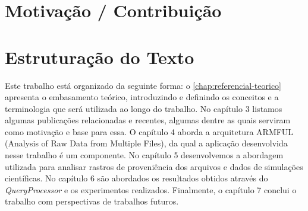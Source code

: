 


\section{Motivação / Contribuição} %

\section{Estruturação do Texto}


Este trabalho está organizado da seguinte forma:
o \autoref{chap:referencial-teorico} apresenta o embasamento teórico, introduzindo e definindo os conceitos e a terminologia que será utilizada ao longo do trabalho.
No capítulo 3 listamos algumas publicações relacionadas e recentes, algumas dentre as quais serviram como motivação e base para essa.
O capítulo 4 aborda a arquitetura  ARMFUL (Analysis of Raw Data from Multiple Files), da qual a aplicação desenvolvida nesse trabalho é um componente.
No capítulo 5 desenvolvemos a abordagem utilizada para analisar rastros de proveniência dos arquivos e dados de simulações científicas.
No capítulo 6 são abordados os resultados obtidos através do \textit{QueryProcessor} e os experimentos realizados.
Finalmente, o capítulo 7 conclui o trabalho com perspectivas de trabalhos futuros.